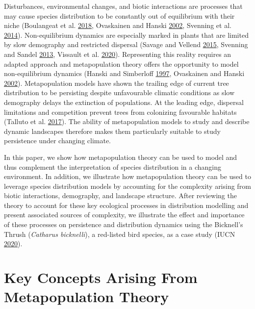 \documentclass[12pt]{article}
\begin{document}
Disturbances, environmental changes, and biotic interactions are
processes that may cause species distribution to be constantly out of
equilibrium with their niche (Boulangeat et al.
\protect\hyperlink{ref-boulangeat_transient_2018}{2018}, Ovaskainen and
Hanski \protect\hyperlink{ref-ovaskainen_transient_2002}{2002}, Svenning
et al. \protect\hyperlink{ref-svenning_influence_2014}{2014}).
Non-equilibrium dynamics are especially marked in plants that are
limited by slow demography and restricted dispersal (Savage and Vellend
\protect\hyperlink{ref-savage_elevational_2015}{2015}, Svenning and
Sandel \protect\hyperlink{ref-svenning_disequilibrium_2013}{2013},
Vissault et al. \protect\hyperlink{ref-vissault_slow_2020}{2020}).
Representing this reality requires an adapted approach and
metapopulation theory offers the opportunity to model non-equilibrium
dynamics (Hanski and Simberloff
\protect\hyperlink{ref-hanski_metapopulation_1997}{1997}, Ovaskainen and
Hanski \protect\hyperlink{ref-ovaskainen_transient_2002}{2002}).
Metapopulation models have shown the trailing edge of current tree
distribution to be persisting despite unfavourable climatic conditions
as slow demography delays the extinction of populations. At the leading
edge, dispersal limitations and competition prevent trees from
colonizing favourable habitats (Talluto et al.
\protect\hyperlink{ref-talluto_extinction_2017}{2017}). The ability of
metapopulation models to study and describe dynamic landscapes therefore
makes them particularly suitable to study persistence under changing
climate.

In this paper, we show how metapopulation theory can be used to model
and thus complement the interpretation of species distribution in a
changing environment. In addition, we illustrate how metapopulation
theory can be used to leverage species distribution models by accounting
for the complexity arising from biotic interactions, demography, and
landscape structure. After reviewing the theory to account for these key
ecological processes in distribution modelling and present associated
sources of complexity, we illustrate the effect and importance of these
processes on persistence and distribution dynamics using the Bicknell's
Thrush (\emph{Catharus bicknelli}), a red-listed bird species, as a case
study (IUCN \protect\hyperlink{ref-iucn_catharus_2020}{2020}).

\hypertarget{key-concepts-arising-from-metapopulation-theory}{%
\section{Key Concepts Arising From Metapopulation
Theory}\label{key-concepts-arising-from-metapopulation-theory}}
\end{document}
